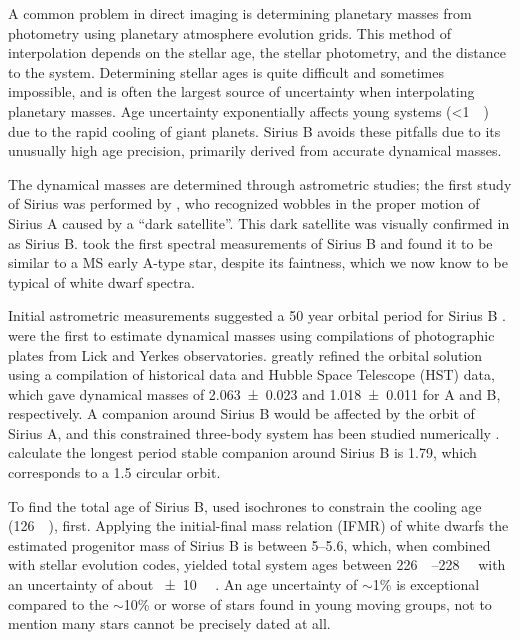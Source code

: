 \documentclass[twocolumn,linenumbers]{aastex631}
\begin{document}
A common problem in direct imaging is determining planetary masses from photometry using planetary atmosphere evolution grids. This method of interpolation depends on the stellar age, the stellar photometry, and the distance to the system. Determining stellar ages is quite difficult and sometimes impossible, and is often the largest source of uncertainty when interpolating planetary masses. Age uncertainty exponentially affects young systems (\textless\qty{1}{\giga\year}) due to the rapid cooling of giant planets. Sirius B avoids these pitfalls due to its unusually high age precision, primarily derived from accurate dynamical masses.

The dynamical masses are determined through astrometric studies; the first study of Sirius was performed by \citet{besselVariationsProperMotions1844}, who recognized wobbles in the proper motion of Sirius A caused by a ``dark satellite''. This dark satellite was visually confirmed in \citet{bondCompanionSiriusProf1862} as Sirius B. \citet{adamsSpectrumCompanionSirius1915} took the first spectral measurements of Sirius B and found it to be similar to a MS early A-type star, despite its faintness, which we now know to be typical of white dwarf spectra.

Initial astrometric measurements suggested a 50 year orbital period for Sirius B \citep{auwersOrbitSirius1864}. \citet{vandenbosOrbitSiriusADS1960,gatewoodStudySirius1978} were the first to estimate dynamical masses using compilations of photographic plates from Lick and Yerkes observatories. \citet{bondSiriusSystemIts2017} greatly refined the orbital solution using a compilation of historical data and Hubble Space Telescope (HST) data, which gave dynamical masses of \qty{2.063+-0.023}{\solarmass} and \qty{1.018+-0.011}{\solarmass} for A and B, respectively. A companion around Sirius B would be affected by the orbit of Sirius A, and this constrained three-body system has been studied numerically \citep{holmanLongTermStabilityPlanets1999}. \citet{bondSiriusSystemIts2017} calculate the longest period stable companion around Sirius B is \qty{1.79}{\year}, which corresponds to a \qty{1.5}{\au} circular orbit.

To find the total age of Sirius B, \citet{bondSiriusSystemIts2017} used isochrones to constrain the cooling age (\qty{126}{\mega\year}), first. Applying the initial-final mass relation (IFMR) of white dwarfs \citep{cummingsTwoMassiveWhite2016} the estimated progenitor mass of Sirius B is between \qtyrange{5}{5.6}{\solarmass}, which, when combined with stellar evolution codes, yielded total system ages between \qtyrange{226}{228}{\mega\year} with an uncertainty of about \qty{+-10}{\mega\year} \citep{bondSiriusSystemIts2017}. An age uncertainty of $\sim$1\% is exceptional compared to the $\sim$10\% or worse of stars found in young moving groups, not to mention many stars cannot be precisely dated at all.
\end{document}
